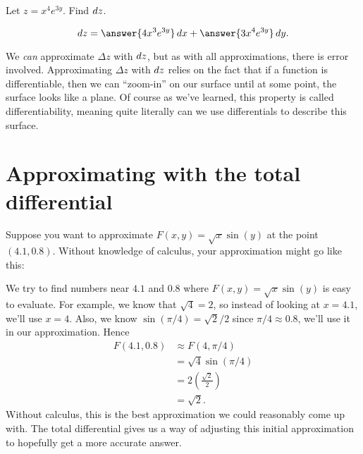 \documentclass{ximera}
\begin{document}
\begin{question}
  Let $z = x^4e^{3y}$. Find $\mathop{}\!d z$.
  \begin{prompt}
    \[
    dz = \answer{4x^3e^{3y}}\d x+\answer{3x^4e^{3y}}\d y.
    \]
  \end{prompt}
\end{question}

We \textit{can} approximate $\Delta z$ with $\mathop{}\!d z$, but as with all
approximations, there is error involved. Approximating $\Delta z$ with
$\mathop{}\!d z$ relies on the fact that if a function is differentiable, then
we can ``zoom-in'' on our surface until at some point, the surface
looks like a plane. Of course as we've learned, this property is
called differentiability, meaning quite literally can we use
differentials to describe this surface.


\section{Approximating with the total differential}

Suppose you want to approximate $F(x,y)=\sqrt{x}\sin(y)$ at the point
$(4.1,0.8)$. Without knowledge of calculus, your approximation might
go like this:

We try to find numbers near $4.1$ and $0.8$ where
$F(x,y)=\sqrt{x}\sin(y)$ is easy to evaluate. For example, we know
that $\sqrt{4}= 2$, so instead of looking at $x=4.1$, we'll use
$x=4$. Also, we know $\sin(\pi/4)= \sqrt{2}/2$ since $\pi/4\approx
0.8$, we'll use it in our approximation. Hence
\begin{align*}
  F(4.1,0.8) &\approx F(4,\pi/4) \\
  &= \sqrt{4}\sin(\pi/4)\\
  &= 2\left(\frac{\sqrt{2}}2\right)\\
  &= \sqrt{2}.
\end{align*}
Without calculus, this is the best approximation we could
reasonably come up with. The total differential gives us a way of
adjusting this initial approximation to hopefully get a more
accurate answer.
\end{document}
